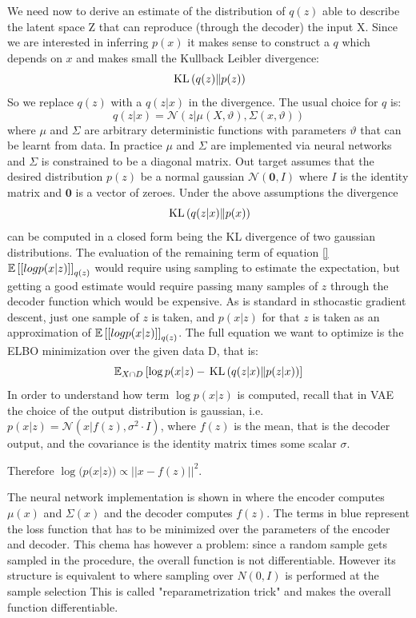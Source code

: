 
We need now to derive an estimate of the distribution of $q(z)$ able to describe the latent space Z that can reproduce (through the decoder) the input X. Since we are interested in inferring $p(x)$ it makes sense to construct a $q$ which depends on $x$ and makes small the Kullback Leibler divergence:
\begin{equation}
  \,\mathrm{KL}\left( q(z)\lVert p(z) \right) 
\end{equation}
So we replace $q(z)$ with a $q(z|x)$ in the divergence. The usual choice for $q$ is:
\begin{equation}
    q(z|x) = \mathcal{N}(z| \mu(X,\vartheta), \Sigma(x,\vartheta))
\end{equation}
where $\mu$ and $\Sigma$ are arbitrary deterministic functions with parameters $\vartheta$ that can be learnt from data.
In practice $\mu$ and $\Sigma$ are implemented via neural networks and $\Sigma$ is constrained to be a diagonal matrix.
Out target assumes that the desired distribution $p(z)$ be a normal gaussian $\mathcal{N}(\bm{0},I)$ where $I$ is the identity matrix and $\bm{0}$ is a vector of zeroes. Under the above assumptions the divergence $$  \,\mathrm{KL}\left( q(z|x)\lVert p(x) \right)  $$ can be computed in a closed form being the KL divergence of two gaussian distributions.
The evaluation of the remaining term of equation \eqref{} $ \mathbb{E} \left[ [log p(x|z)] \right]_{q(z)} $
would require using sampling to estimate the expectation, but getting a good estimate would require passing many samples of $z$ through the decoder function which would be expensive. 
As is standard in sthocastic gradient descent, just one sample of $z$ is taken, and $p(x|z)$ for that $z$ is taken as an approximation of 
$\mathbb{E} \left[ [log p(x|z)] \right]_{q(z)}$.
The full equation we want to optimize is the ELBO minimization over the given data D, that is:
\begin{equation}
    \mathbb{E}_{X \cap D} \left[ \log p(x|z) -  \,\mathrm{KL}\left( q(z|x)\lVert p(z|x) \right)  \right]
\end{equation}
In order to understand how term $\log p(x|z)$ is computed, recall that in VAE the choice of the output distribution is gaussian, 
i.e. $ p(x|z) = \mathcal{N}(x|f(z), \sigma^2 \cdot I ) $, where $f(z)$ is the mean, that is the decoder output, and the covariance is the identity matrix times some scalar $\sigma$.

Therefore $\log(p(x|z)) \propto ||x-f(z)||^2 $.

The neural network implementation is shown in \Figure{\ref{}}%
where the encoder computes $\mu(x)$ and $\Sigma(x)$ and the decoder computes $f(z)$. The terms in blue represent the loss function that has to be minimized over the parameters of the encoder and decoder. This chema has however a problem: since a random sample gets sampled in the procedure, the overall function is not differentiable. However its structure is equivalent to  where sampling over $N(0,I)$ is performed at the sample selection
This is called "reparametrization trick" and makes the overall function differentiable.



